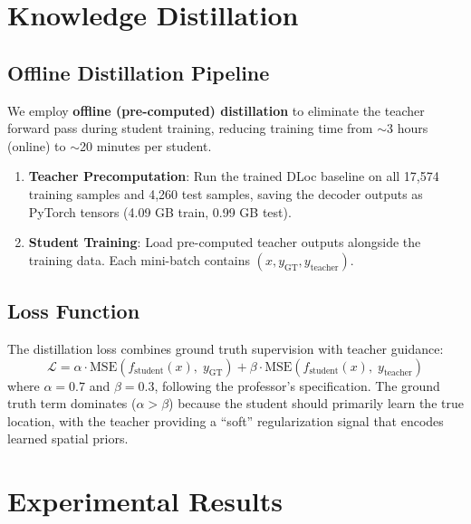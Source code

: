\documentclass[11pt,a4paper]{article}
\begin{document}
\section{Knowledge Distillation}

\subsection{Offline Distillation Pipeline}

We employ \textbf{offline (pre-computed) distillation} to eliminate the teacher forward pass during student training, reducing training time from $\sim$3 hours (online) to $\sim$20 minutes per student.

\begin{enumerate}[leftmargin=*]
    \item \textbf{Teacher Precomputation}: Run the trained DLoc baseline on all 17,574 training samples and 4,260 test samples, saving the decoder outputs as PyTorch tensors (4.09 GB train, 0.99 GB test).
    \item \textbf{Student Training}: Load pre-computed teacher outputs alongside the training data. Each mini-batch contains $(x, y_\text{GT}, y_\text{teacher})$.
\end{enumerate}

\subsection{Loss Function}

The distillation loss combines ground truth supervision with teacher guidance:
\begin{equation}
    \mathcal{L} = \alpha \cdot \text{MSE}(f_\text{student}(x),\; y_\text{GT}) + \beta \cdot \text{MSE}(f_\text{student}(x),\; y_\text{teacher})
\end{equation}
where $\alpha = 0.7$ and $\beta = 0.3$, following the professor's specification. The ground truth term dominates ($\alpha > \beta$) because the student should primarily learn the true location, with the teacher providing a ``soft'' regularization signal that encodes learned spatial priors.

\section{Experimental Results}
\end{document}
